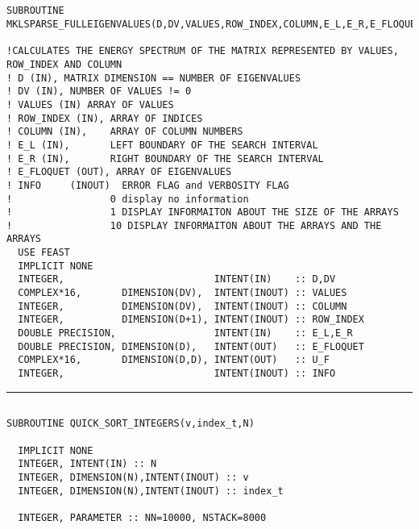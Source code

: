 \documentclass[10pt,a4paper]{article}
\begin{document}
\begin{verbatim}


SUBROUTINE MKLSPARSE_FULLEIGENVALUES(D,DV,VALUES,ROW_INDEX,COLUMN,E_L,E_R,E_FLOQUET,U_F,INFO)

!CALCULATES THE ENERGY SPECTRUM OF THE MATRIX REPRESENTED BY VALUES, ROW_INDEX AND COLUMN
! D (IN), MATRIX DIMENSION == NUMBER OF EIGENVALUES
! DV (IN), NUMBER OF VALUES != 0
! VALUES (IN) ARRAY OF VALUES
! ROW_INDEX (IN), ARRAY OF INDICES
! COLUMN (IN),    ARRAY OF COLUMN NUMBERS
! E_L (IN),       LEFT BOUNDARY OF THE SEARCH INTERVAL
! E_R (IN),       RIGHT BOUNDARY OF THE SEARCH INTERVAL
! E_FLOQUET (OUT), ARRAY OF EIGENVALUES
! INFO     (INOUT)  ERROR FLAG and VERBOSITY FLAG
!                 0 display no information
!                 1 DISPLAY INFORMAITON ABOUT THE SIZE OF THE ARRAYS
!                 10 DISPLAY INFORMAITON ABOUT THE ARRAYS AND THE ARRAYS
  USE FEAST
  IMPLICIT NONE
  INTEGER,                          INTENT(IN)    :: D,DV
  COMPLEX*16,       DIMENSION(DV),  INTENT(INOUT) :: VALUES
  INTEGER,          DIMENSION(DV),  INTENT(INOUT) :: COLUMN
  INTEGER,          DIMENSION(D+1), INTENT(INOUT) :: ROW_INDEX
  DOUBLE PRECISION,                 INTENT(IN)    :: E_L,E_R
  DOUBLE PRECISION, DIMENSION(D),   INTENT(OUT)   :: E_FLOQUET
  COMPLEX*16,       DIMENSION(D,D), INTENT(OUT)   :: U_F
  INTEGER,                          INTENT(INOUT) :: INFO

\end{verbatim}
\begin{center}
\rule{12cm}{1pt}
\end{center}

\begin{verbatim}

SUBROUTINE QUICK_SORT_INTEGERS(v,index_t,N)

  IMPLICIT NONE
  INTEGER, INTENT(IN) :: N
  INTEGER, DIMENSION(N),INTENT(INOUT) :: v
  INTEGER, DIMENSION(N),INTENT(INOUT) :: index_t

  INTEGER, PARAMETER :: NN=10000, NSTACK=8000

\end{verbatim}
\end{document}

